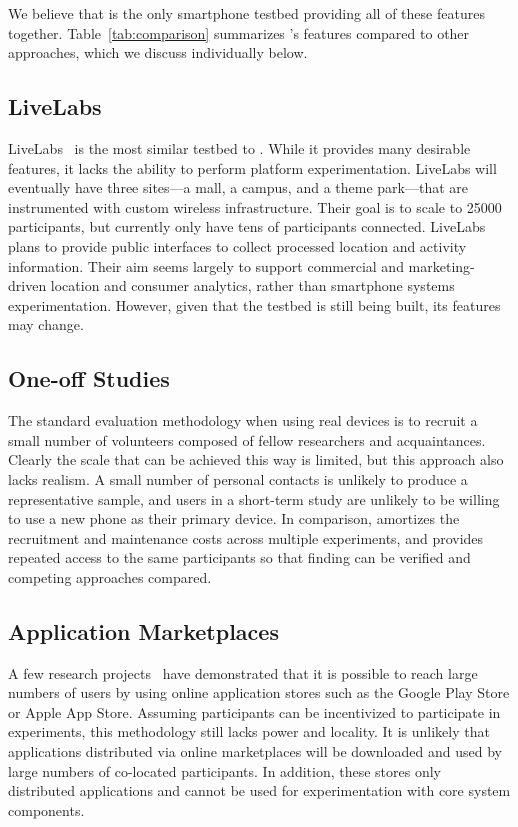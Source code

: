 We believe that \PhoneLab{} is the only smartphone testbed providing all of
these features together. Table~\ref{tab:comparison} summarizes \PhoneLab{}'s
features compared to other approaches, which we discuss individually below.

\subsection{LiveLabs}

LiveLabs~\cite{livelabs} is the most similar testbed to \PhoneLab{}. While it
provides many desirable features, it lacks the ability to perform platform
experimentation. LiveLabs will eventually have three sites---a mall, a
campus, and a theme park---that are instrumented with custom wireless
infrastructure. Their goal is to scale to \num{25000} participants, but
currently only have tens of participants connected. LiveLabs plans to provide
public interfaces to collect processed location and activity information.
Their aim seems largely to support commercial and marketing-driven location
and consumer analytics, rather than smartphone systems experimentation.
However, given that the testbed is still being built, its features may
change.

\subsection{One-off Studies}

The standard evaluation methodology when using real devices is to recruit a
small number of volunteers composed of fellow researchers and acquaintances.
Clearly the scale that can be achieved this way is limited, but this approach
also lacks realism. A small number of personal contacts is unlikely to
produce a representative sample, and users in a short-term study are unlikely
to be willing to use a new phone as their primary device. In comparison,
\PhoneLab{} amortizes the recruitment and maintenance costs across multiple
experiments, and provides repeated access to the same participants so that
finding can be verified and competing approaches compared.

\subsection{Application Marketplaces}

A few research projects~\cite{huang:mobisys:2010, zhang:codes:2010} have
demonstrated that it is possible to reach large numbers of users by using
online application stores such as the Google Play Store or Apple App Store.
Assuming participants can be incentivized to participate in experiments, this
methodology still lacks power and locality. It is unlikely that applications
distributed via online marketplaces will be downloaded and used by large
numbers of co-located participants. In addition, these stores only
distributed applications and cannot be used for experimentation with core
system components.

